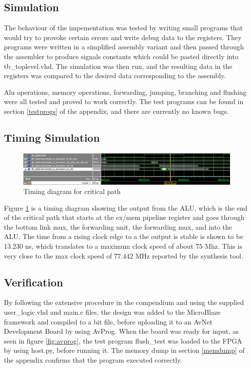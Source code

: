 \subsection{Simulation}

The behaviour of the impementation was tested by writing small programs that would try to provoke certain errors and write debug data to the registers.
They programs were written in a simplified assembly variant and then passed through the assembler to produce signals constants which could be pasted directly into tb\_toplevel.vhd.
The simulation was then run, and the resulting data in the registers was compared to the desired data corresponding to the assembly.

Alu operations, memory operations, forwarding, jumping, branching and flushing were all tested and proved to work correctly.
The test programs can be found in section \ref{testprogs} of the appendix, and there are currently no known bugs.

\subsection{Timing Simulation}

\begin{figure}[ht]
    \centering
    \includegraphics[scale=0.5]{figures/TimingSimulation.png}
    \caption{Timing diagram for critical path} 
    \label{fig:timing}
\end{figure}

Figure \ref{fig:timing} is a timing diagram showing the output from the ALU, which is the end of the critical path that starts at the ex/mem pipeline register and goes through the bottom link mux, the forwarding unit, the forwarding mux, and into the ALU.
The time from a rising clock edge to a the output is stable is shown to be $13.230$ ns, which translates to a maximum clock speed of about $75$ Mhz.
This is very close to the max clock speed of $77.442$ MHz reported by the synthesis tool.

\subsection{Verification}

By following the extensive procedure in the compendium \cite[p.47]{lab-compendium} and using the supplied user\_logic.vhd and main.c files, the design was added to the MicroBlaze framework and compiled to a bit file, before uploading it to an AvNet Development Board by using AvProg.
When the board was ready for input, as seen in figure \ref{fig:avprog}, the test program flush\_test was loaded to the FPGA by using host.py, before running it.
The memory dump in section \ref{memdump} of the appendix confirms that the program executed correctly.

